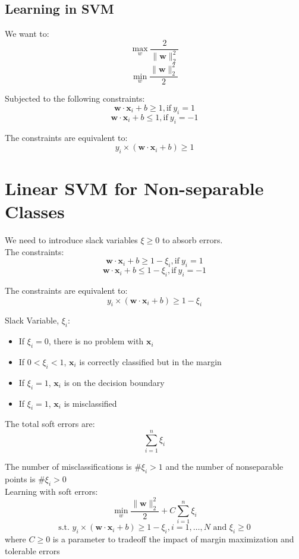 \begin{multicols}{2}
\subsection{Learning in SVM}

\noindent We want to:
$$\!\max_w \frac{2}{\| \mathbf{w} \|_2^2}$$
$$\!\min_w \frac{\| \mathbf{w} \|_2^2}{2}$$

\noindent Subjected to the following constraints:
$$\mathbf{w} \cdot \mathbf{x}_i + b \ge 1, \text{if}\ y_i=1$$
$$\mathbf{w} \cdot \mathbf{x}_i + b \le 1, \text{if}\ y_i=-1$$

\noindent The constraints are equivalent to:
$$y_i \times (\mathbf{w} \cdot \mathbf{x}_i + b) \ge 1$$

\section{Linear SVM for Non-separable Classes}

\noindent We need to introduce slack variables $\xi \ge 0$ to absorb errors. \\

\noindent The constraints:
$$\mathbf{w} \cdot \mathbf{x}_i + b \ge 1 - \xi_i, \text{if}\ y_i=1$$
$$\mathbf{w} \cdot \mathbf{x}_i + b \le 1 - \xi_i, \text{if}\ y_i=-1$$

\noindent The constraints are equivalent to:
$$y_i \times (\mathbf{w} \cdot \mathbf{x}_i + b) \ge 1 - \xi_i$$

\noindent Slack Variable, $\xi_i$:
\begin{itemize}
    \item If $\xi_i=0$, there is no problem with $\mathbf x_i$
    \item If $0<\xi_i<1$, $\mathbf x_i$ is correctly classified but in the margin
    \item If $\xi_i=1$, $\mathbf x_i$ is on the decision boundary
    \item If $\xi_i=1$, $\mathbf x_i$ is misclassified
\end{itemize}

\noindent The total soft errors are:
$$\sum_{i=1}^n \xi_i$$

\noindent The number of misclassifications is \#{$\xi_i > 1$} and the number of nonseparable points is \#{$\xi_i > 0$} \\

\noindent Learning with soft errors:
$$\!\min_w \frac{\| \mathbf{w} \|_2^2}{2} + C \sum_{i=1}^n \xi_i$$
$$\text{s.t. } y_i \times (\mathbf{w} \cdot \mathbf{x}_i + b) \ge 1 - \xi_i, i=1,\ldots,N \text{ and } \xi_i \ge 0$$
\noindent where $C \ge 0$ is a parameter to tradeoff the impact of margin maximization and tolerable errors

\end{multicols}
